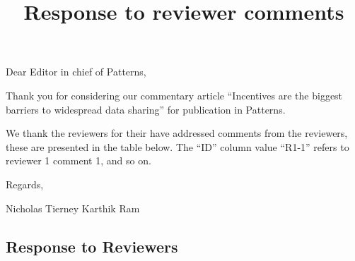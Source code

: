 \documentclass[
]{article}
\title{Response to reviewer comments}
\author{}
\date{\vspace{-2.5em}}
\begin{document}
\maketitle

Dear Editor in chief of Patterns,

Thank you for considering our commentary article ``Incentives are the
biggest barriers to widespread data sharing'' for publication in
Patterns.

We thank the reviewers for their have addressed comments from the
reviewers, these are presented in the table below. The ``ID'' column
value ``R1-1'' refers to reviewer 1 comment 1, and so on.

Regards,

Nicholas Tierney Karthik Ram

\hypertarget{response-to-reviewers}{%
\subsection{Response to Reviewers}\label{response-to-reviewers}}
\end{document}
